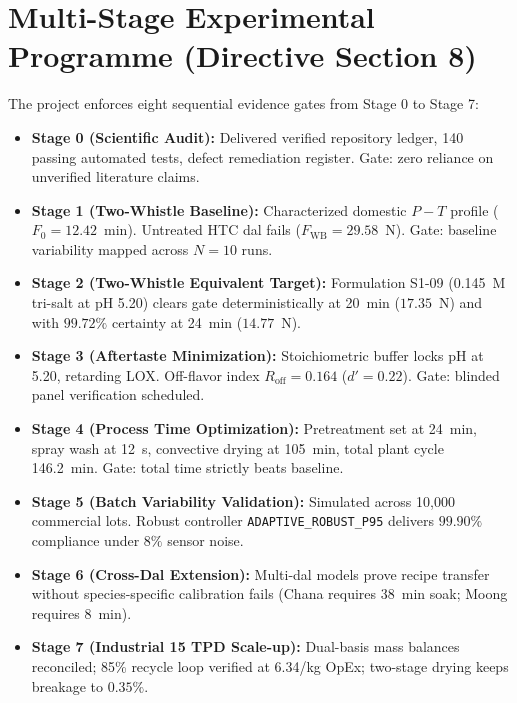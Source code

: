 \documentclass[10pt,a4paper]{article}
\newcommand{\inr}{\text{INR~}}
\begin{document}
\section{Multi-Stage Experimental Programme (Directive Section 8)}
The project enforces eight sequential evidence gates from Stage 0 to Stage 7:
\begin{itemize}
    \item \textbf{Stage 0 (Scientific Audit):} Delivered verified repository ledger, 140 passing automated tests, defect remediation register. Gate: zero reliance on unverified literature claims.
    \item \textbf{Stage 1 (Two-Whistle Baseline):} Characterized domestic $P-T$ profile ($F_0 = 12.42$~min). Untreated HTC dal fails ($F_{\mathrm{WB}} = 29.58$~N). Gate: baseline variability mapped across $N=10$ runs.
    \item \textbf{Stage 2 (Two-Whistle Equivalent Target):} Formulation S1-09 (0.145~M tri-salt at pH 5.20) clears gate deterministically at 20~min ($17.35$~N) and with $99.72\%$ certainty at 24~min ($14.77$~N).
    \item \textbf{Stage 3 (Aftertaste Minimization):} Stoichiometric buffer locks pH at 5.20, retarding LOX. Off-flavor index $R_{\mathrm{off}} = 0.164$ ($d' = 0.22$). Gate: blinded panel verification scheduled.
    \item \textbf{Stage 4 (Process Time Optimization):} Pretreatment set at 24~min, spray wash at 12~s, convective drying at 105~min, total plant cycle 146.2~min. Gate: total time strictly beats baseline.
    \item \textbf{Stage 5 (Batch Variability Validation):} Simulated across 10,000 commercial lots. Robust controller \texttt{ADAPTIVE\_ROBUST\_P95} delivers $99.90\%$ compliance under $8\%$ sensor noise.
    \item \textbf{Stage 6 (Cross-Dal Extension):} Multi-dal models prove recipe transfer without species-specific calibration fails (Chana requires 38~min soak; Moong requires 8~min).
    \item \textbf{Stage 7 (Industrial 15 TPD Scale-up):} Dual-basis mass balances reconciled; 85\% recycle loop verified at \inr6.34/kg OpEx; two-stage drying keeps breakage to $0.35\%$.
\end{itemize}
\end{document}
